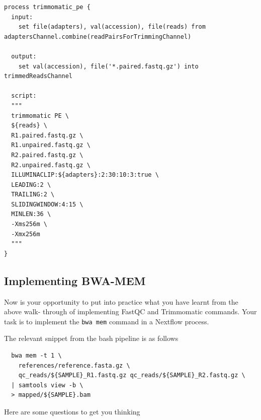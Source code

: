 \begin{lstlisting}
process trimmomatic_pe {
  input:
    set file(adapters), val(accession), file(reads) from adaptersChannel.combine(readPairsForTrimmingChannel)

  output:
    set val(accession), file('*.paired.fastq.gz') into trimmedReadsChannel

  script:
  """
  trimmomatic PE \
  ${reads} \
  R1.paired.fastq.gz \
  R1.unpaired.fastq.gz \
  R2.paired.fastq.gz \
  R2.unpaired.fastq.gz \
  ILLUMINACLIP:${adapters}:2:30:10:3:true \
  LEADING:2 \
  TRAILING:2 \
  SLIDINGWINDOW:4:15 \
  MINLEN:36 \
  -Xms256m \
  -Xmx256m
  """
}
\end{lstlisting}




\subsection{Implementing BWA-MEM}

Now is your opportunity to put into practice what you have learnt from the above walk-
through of implementing FastQC and Trimmomatic commands. Your task is to implement
the \texttt{bwa mem} command in a Nextflow process.


The relevant snippet from the bash pipeline is as follows 
\begin{lstlisting}
  bwa mem -t 1 \
    references/reference.fasta.gz \
    qc_reads/${SAMPLE}_R1.fastq.gz qc_reads/${SAMPLE}_R2.fastq.gz \
  | samtools view -b \
  > mapped/${SAMPLE}.bam
\end{lstlisting}

Here are some questions to get you thinking 

